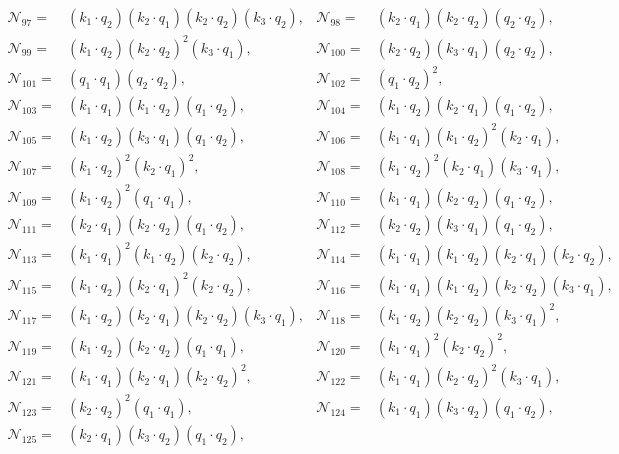 \documentclass[twocolumn,aps,showpacs,nofootinbib,superscriptaddress,prd]{revtex4-2}
\begin{document}
\begin{widetext}
\begin{align}
{\mathcal N}_{97}=&(k_1\cdot q_2) (k_2\cdot q_1) (k_2\cdot q_2) (k_3\cdot q_2),&
{\mathcal N}_{98}=&(k_2\cdot q_1) (k_2\cdot q_2) (q_2\cdot q_2),\nonumber\\
{\mathcal N}_{99}=&(k_1\cdot q_2) (k_2\cdot q_2)^2 (k_3\cdot q_1),&
{\mathcal N}_{100}=&(k_2\cdot q_2) (k_3\cdot q_1) (q_2\cdot q_2),\nonumber\\
{\mathcal N}_{101}=&(q_1\cdot q_1) (q_2\cdot q_2),&
{\mathcal N}_{102}=&(q_1\cdot q_2)^2,\nonumber\\
{\mathcal N}_{103}=&(k_1\cdot q_1) (k_1\cdot q_2) (q_1\cdot q_2),&
{\mathcal N}_{104}=&(k_1\cdot q_2) (k_2\cdot q_1) (q_1\cdot q_2),\nonumber\\
{\mathcal N}_{105}=&(k_1\cdot q_2) (k_3\cdot q_1) (q_1\cdot q_2),&
{\mathcal N}_{106}=&(k_1\cdot q_1) (k_1\cdot q_2)^2 (k_2\cdot q_1),\nonumber\\
{\mathcal N}_{107}=&(k_1\cdot q_2)^2 (k_2\cdot q_1)^2,&
{\mathcal N}_{108}=&(k_1\cdot q_2)^2 (k_2\cdot q_1) (k_3\cdot q_1),\nonumber\\
{\mathcal N}_{109}=&(k_1\cdot q_2)^2 (q_1\cdot q_1),&
{\mathcal N}_{110}=&(k_1\cdot q_1) (k_2\cdot q_2) (q_1\cdot q_2),\nonumber\\
{\mathcal N}_{111}=&(k_2\cdot q_1) (k_2\cdot q_2) (q_1\cdot q_2),&
{\mathcal N}_{112}=&(k_2\cdot q_2) (k_3\cdot q_1) (q_1\cdot q_2),\nonumber\\
{\mathcal N}_{113}=&(k_1\cdot q_1)^2 (k_1\cdot q_2) (k_2\cdot q_2),&
{\mathcal N}_{114}=&(k_1\cdot q_1) (k_1\cdot q_2) (k_2\cdot q_1) (k_2\cdot q_2),\nonumber\\
{\mathcal N}_{115}=&(k_1\cdot q_2) (k_2\cdot q_1)^2 (k_2\cdot q_2),&
{\mathcal N}_{116}=&(k_1\cdot q_1) (k_1\cdot q_2) (k_2\cdot q_2) (k_3\cdot q_1),\nonumber\\
{\mathcal N}_{117}=&(k_1\cdot q_2) (k_2\cdot q_1) (k_2\cdot q_2) (k_3\cdot q_1),&
{\mathcal N}_{118}=&(k_1\cdot q_2) (k_2\cdot q_2) (k_3\cdot q_1)^2,\nonumber\\
{\mathcal N}_{119}=&(k_1\cdot q_2) (k_2\cdot q_2) (q_1\cdot q_1),&
{\mathcal N}_{120}=&(k_1\cdot q_1)^2 (k_2\cdot q_2)^2,\nonumber\\
{\mathcal N}_{121}=&(k_1\cdot q_1) (k_2\cdot q_1) (k_2\cdot q_2)^2,&
{\mathcal N}_{122}=&(k_1\cdot q_1) (k_2\cdot q_2)^2 (k_3\cdot q_1),\nonumber\\
{\mathcal N}_{123}=&(k_2\cdot q_2)^2 (q_1\cdot q_1),&
{\mathcal N}_{124}=&(k_1\cdot q_1) (k_3\cdot q_2) (q_1\cdot q_2),\nonumber\\
{\mathcal N}_{125}=&(k_2\cdot q_1) (k_3\cdot q_2) (q_1\cdot q_2),&

\end{align}
\end{widetext}
\end{document}
